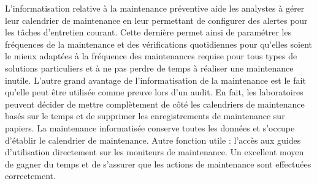 L’informatisation relative à la maintenance préventive aide les analystes à gérer leur calendrier 
de maintenance en leur permettant de configurer des alertes pour les tâches d’entretien courant. 
Cette dernière permet ainsi de paramétrer les fréquences de la maintenance et des vérifications 
quotidiennes pour qu’elles soient le mieux adaptées à la fréquence des maintenances requise pour 
tous types de solutions particuliers et à ne pas perdre de temps à réaliser une maintenance inutile.
L’autre grand avantage de l’informatisation de la maintenance est le fait qu’elle peut être utilisée comme preuve lors d’un audit. En fait, les laboratoires peuvent décider de mettre complètement de côté les calendriers de maintenance basés sur le temps et de supprimer les enregistrements de maintenance  sur papiers. 
La maintenance informatisée conserve toutes les données et s’occupe d’établir le calendrier de maintenance. Autre fonction utile : l’accès aux guides d’utilisation directement sur les moniteurs de maintenance. Un excellent moyen de gagner du temps et de s’assurer que les actions de maintenance sont effectuées correctement.
\pagebreak